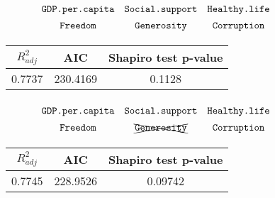 \documentclass{beamer}
\begin{document}
\begin{frame}
    \begin{equation*}
    {\renewcommand*{\arraystretch}{1.4}
    \begin{array}{ccc}
    {\texttt{GDP.per.capita}} & {\texttt{Social.support}} & {\texttt{Healthy.life}} \\
    {\texttt{Freedom}}        & {\texttt{Generosity}}     & {\texttt{Corruption}}
    \end{array}}
    \end{equation*}

    \begin{figure}[h]
    \centering
    {\renewcommand\arraystretch{1.6}
    \begin{tabular}{|c|c|c|}
    \hline
    $R^2_{adj}$ & AIC & Shapiro test p-value \\
    \hline
    0.7737  & 230.4169 & 0.1128 \\
    \hline
    \end{tabular}}
    \end{figure}
\end{frame}

\begin{frame}
    \begin{equation*}
    {\renewcommand*{\arraystretch}{1.4}
    \begin{array}{ccc}
    {\texttt{GDP.per.capita}} & {\texttt{Social.support}} & {\texttt{Healthy.life}} \\
    {\texttt{Freedom}}        & \xcancel{\texttt{Generosity}}     & {\texttt{Corruption}}
    \end{array}}
    \end{equation*}

    \begin{figure}[h]
    \centering
    {\renewcommand\arraystretch{1.6}
    \begin{tabular}{|c|c|c|}
    \hline
    $R^2_{adj}$ & AIC & Shapiro test p-value \\
    \hline
    0.7745  & 228.9526 & 0.09742 \\
    \hline
    \end{tabular}}
    \end{figure}
\end{frame}
\end{document}
